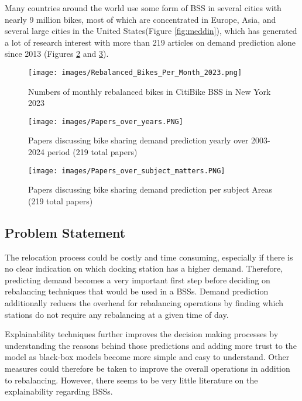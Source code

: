 \documentclass{article}
\begin{document}
Many countries around the world use some form of BSS in several cities with nearly 9 million bikes, most of which are concentrated in Europe, Asia, and several large cities in the United States\cite{Meddin2022}(Figure \ref{fig:meddin}), which has generated a lot of research interest with more than 219 articles on demand prediction alone since 2013 (Figures \ref{fig:papers_1} and \ref{fig:papers_2}).

\begin{figure}
\centering
\texttt{[image: images/Rebalanced\_Bikes\_Per\_Month\_2023.png]}
\caption{Numbers of monthly rebalanced bikes in CitiBike BSS in New York 2023}
\label{fig:rebalance}
\end{figure}

\begin{figure}
\centering
\texttt{[image: images/Papers\_over\_years.PNG]}
\caption{Papers discussing bike sharing demand prediction yearly over 2003-2024 period (219 total papers)}
\label{fig:papers_1}
\end{figure}

\begin{figure}
\centering
\texttt{[image: images/Papers\_over\_subject\_matters.PNG]}
\caption{Papers discussing bike sharing demand prediction per subject Areas (219 total papers)}
\label{fig:papers_2}
\end{figure}

\subsection{Problem Statement}

The relocation process could be costly and time consuming, especially if there is no clear indication on which docking station has a higher demand\cite{Cho2021}. Therefore, predicting demand becomes a very important first step before deciding on rebalancing techniques that would be used in a BSSs. Demand prediction additionally reduces the overhead for rebalancing operations by finding which stations do not require any rebalancing at a given time of day.

Explainability techniques further improves the decision making processes by understanding the reasons behind those predictions and adding more trust to the model as black-box models become more simple and easy to understand. Other measures could therefore be taken to improve the overall operations in addition to rebalancing. However, there seems to be very little literature on the explainability regarding BSSs.
\end{document}
